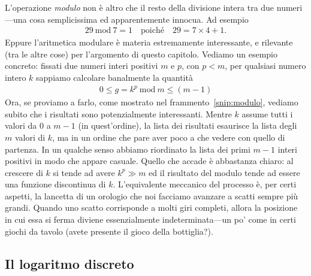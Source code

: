 L'operazione \emph{modulo} non è altro che il resto della divisione intera
tra due numeri---una cosa semplicissima ed apparentemente innocua. Ad esempio
\begin{align*}
  29~\text{mod}~7 = 1 \quad \text{poiché} \quad 29 = 7 \times 4 + 1.
\end{align*}
Eppure l'aritmetica modulare è materia estremamente interessante, e rilevante
(tra le altre cose) per l'argomento di questo capitolo. Vediamo un esempio
concreto: fissati due numeri interi positivi $m$ e $p$, con $p < m$, per
qualsiasi numero intero $k$ sappiamo calcolare banalmente la quantità
\begin{align*}
  0 \leq g = k^p~\text{mod}~m \leq (m - 1)
\end{align*}
Ora, se proviamo a farlo, come mostrato nel frammento~\ref{snip:modulo},
vediamo subito che i risultati sono potenzialmente interessanti. Mentre
$k$ assume tutti i valori da $0$ a $m - 1$ (in quest'ordine), la lista
dei risultati esaurisce la lista degli $m$ valori di $k$, ma in un ordine che
pare aver poco a che vedere con quello di partenza. In un qualche senso abbiamo
riordinato la lista dei primi $m - 1$ interi positivi in modo che appare
casuale. Quello che accade è abbastanza chiaro: al crescere di $k$ si tende
ad avere $k^p \gg m$ ed il risultato del modulo tende ad essere una funzione
discontinua di $k$. L'equivalente meccanico del processo è, per certi
aspetti, la lancetta di un orologio che noi facciamo avanzare a scatti sempre
più grandi. Quando uno scatto corrisponde a molti giri completi, allora la
posizione in cui essa si ferma diviene essenzialmente indeterminata---un po'
come in certi giochi da tavolo (avete presente il gioco della bottiglia?).

\begin{snippet}[htb!]
  \bigskip %
\end{snippet}


\subsection{Il logaritmo discreto}

